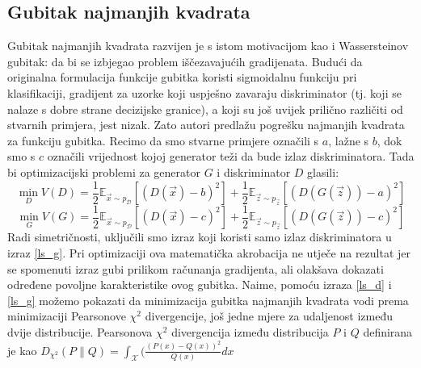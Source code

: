 \subsection{Gubitak najmanjih kvadrata}
Gubitak najmanjih kvadrata  razvijen je s istom motivacijom kao i Wassersteinov gubitak: da bi se izbjegao problem iščezavajućih gradijenata. Budući da originalna formulacija funkcije gubitka koristi sigmoidalnu funkciju pri klasifikaciji, gradijent za uzorke koji uspješno zavaraju diskriminator (tj. koji se nalaze s dobre strane decizijske granice), a koji su još uvijek prilično različiti od stvarnih primjera, jest nizak.  Zato autori predlažu pogrešku najmanjih kvadrata za funkciju gubitka. Recimo da smo stvarne primjere označili s $a$, lažne s $b$, dok smo s $c$ označili vrijednost kojoj generator teži da bude izlaz diskriminatora. Tada bi optimizacijski problemi za generator $G$ i diskriminator $D$ glasili:
\begin{equation}
\label{ls_d}
\min_D V(D) = \frac{1}{2}\mathbb{E}_{\vec{x} \sim p_{\mathcal{D}}}\left[(D(\vec{x}) - b)^2\right] + \frac{1}{2}\mathbb{E}_{\vec{z} \sim p_{\vec{z}}}\left[(D(G(\vec{z})) - a)^2\right]
\end{equation}
\begin{equation}
\label{ls_g}
\min_G V(G) = \frac{1}{2}\mathbb{E}_{\vec{x} \sim p_{\mathcal{D}}}\left[(D(\vec{x}) - c)^2\right] + \frac{1}{2}\mathbb{E}_{\vec{z} \sim p_{\vec{z}}}\left[(D(G(\vec{z})) - c)^2\right]
\end{equation}
Radi simetričnosti, uključili smo izraz koji koristi samo izlaz diskriminatora u izraz \ref{ls_g}. Pri optimizaciji ova matematička akrobacija ne utječe na rezultat jer se spomenuti izraz gubi prilikom računanja gradijenta, ali olakšava dokazati određene povoljne karakteristike ovog gubitka. Naime, pomoću izraza \ref{ls_d} i \ref{ls_g} možemo pokazati da minimizacija gubitka najmanjih kvadrata vodi prema minimizaciji Pearsonove $\chi^2$ divergencije, još jedne mjere za udaljenost između dvije distribucije. Pearsonova $\chi^2$ divergencija između distribucija $P$ i $Q$ definirana je kao $D_{\chi^2}(P\|Q) = \int_{\mathcal{X}} (\frac{(P(x) - Q(x))^2}{Q(x)}dx$

